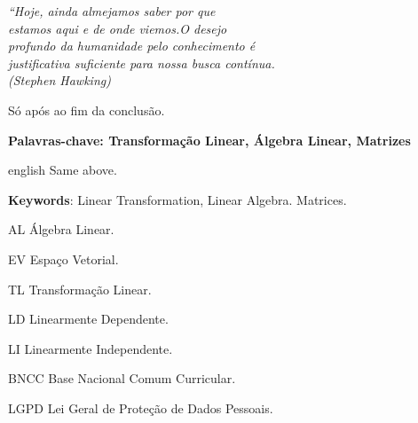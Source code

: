 \documentclass[
12pt,
 a4paper,
    english,
    brazil,
    oneside
    ]{abntex2}
\begin{document}
	\begin{epigrafe}
		\vspace*{\fill}
		\begin{flushright}
			\textit{``Hoje, ainda almejamos saber por que\\
				estamos aqui e de onde viemos.O desejo\\
				profundo da humanidade pelo	conhecimento é\\
				justificativa suficiente para nossa busca contínua.\\
				(Stephen Hawking)}
		\end{flushright}
	\end{epigrafe}
	
	
	\setlength{\absparsep}{18pt} %
	\begin{resumo}
		Só após ao fim da conclusão.
		
		\textbf{Palavras-chave: Transformação Linear, Álgebra Linear, Matrizes}
	\end{resumo}
		
	
	\begin{resumo}[Abstract]
		\begin{otherlanguage*}{english}
			Same above.
			
			\vspace{\onelineskip}
			
			\noindent 
			\textbf{Keywords}: Linear Transformation, Linear Algebra. Matrices.
		\end{otherlanguage*}
	\end{resumo}
	
	
	\listoffigures*
	\cleardoublepage
	
	
	\listoftables*
	\cleardoublepage
	
	\begin{siglas}
		\item[AL] Álgebra Linear.
		\item[EV] Espaço Vetorial.
		\item[TL] Transformação Linear.
		\item[LD] Linearmente Dependente.
		\item[LI] Linearmente Independente.
		\item[BNCC] Base Nacional Comum Curricular.
		\item[LGPD] Lei Geral de Proteção de Dados Pessoais.
	\end{siglas}
	
\end{document}
